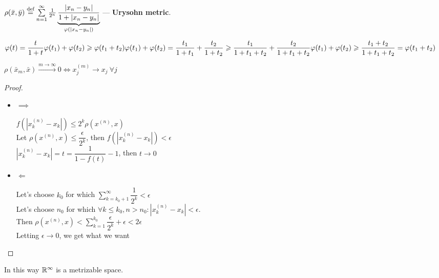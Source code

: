 \begin{defn}
  $\rho(\bar{x}, \bar{y}) \defeq \sum\limits_{n = 1}^\infty \frac{1}{2^n}\underbrace{\frac{|x_n - y_n|}{1 + |x_n - y_n|}}_{\phi(|x_n - y_n|)}$
  --- \textbf{Urysohn metric}.

  \noindent
  \begin{minipage}{.65\linewidth}
    $\displaystyle\phi(t) = \frac{t}{1 + t} \\ \\
    \phi(t_1) + \phi(t_2) \geq \phi(t_1 + t_2) \\ \\
    \phi(t_1) + \phi(t_2) = \frac{t_1}{1 + t_1} + \frac{t_2}{1 + t_2} \geq \frac{t_1}{1 + t_1 + t_2} + \frac{t_2}{1 + t_1 + t_2} \\ \\
    \phi(t_1) + \phi(t_2) \geq \frac{t_1 + t_2}{1 + t_1 + t_2} = \phi(t_1 + t_2)$
  \end{minipage}%
  \begin{minipage}{.35\linewidth}
  \end{minipage}
  \begin{stm}
    $\rho(\bar{x}_m, \bar{x}) \xrightarrow{m \to \infty} 0 \iff x_j^{(m)} \to x_j\ \forall j$\\
  \end{stm}
  \begin{proof}\leavevmode
    \begin{itemize}
      \item $\implies$

      $f(|x^{(n)}_k - x_k|) \leq 2^k \rho(x^{(n)}, x)$ \\
      Let $\rho(x^{(n)}, x) \le \dfrac{\epsilon}{2^k}$, then $f(|x^{(n)}_k - x_k|) < \epsilon$ \\
      $|x^{(n)}_k - x_k| = t = \dfrac{1}{1 - f(t)} - 1$, then $t \to 0$
      \item $\Leftarrow$

      Let's choose $k_0$ for which $\sum\limits_{k=k_0+1}^{\infty} \dfrac{1}{2^k} < \epsilon$ \\
      Let's choose $n_0$ for which $\forall k \leq k_0, n > n_0: |x_k^{(n)} - x_k| < \epsilon$. \\ 
      Then $\rho(x^{(n)}, x) < \sum\limits_{k=1}^{k_0} \dfrac{\epsilon}{2^k} + \epsilon < 2 \epsilon$ \\
      Letting  $\epsilon \to 0$, we get what we want \qedhere
    \end{itemize}
  \end{proof}
  In this way $\R^\infty$ is a metrizable space.
\end{defn}
